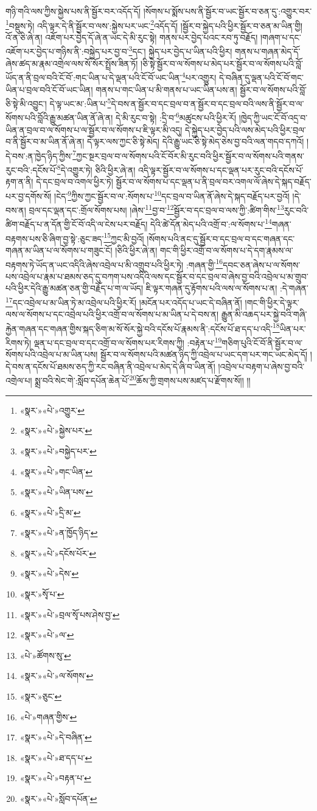 གཉི་གའི་ལས་ཀྱིས་སྐྱེས་པས་ནི་སྦྱོར་བར་འདོད་དོ། །སོགས་པ་སྨོས་པས་ནི་སྦྱོར་བ་ཡང་སྦྱོར་བ་ཅན་དུ་:འགྱུར་བར་\footnote{«སྣར་»«པེ་»འགྱུར་}བསྡུས་ཏེ། འདི་ལྟར་དེ་ནི་སྦྱོར་བ་ལས་:སྐྱེས་པར་ཡང་\footnote{«སྣར་»«པེ་»སྐྱེས་པར་}འདོད་དོ། །སྦྱོར་བ་སྐྱེད་པའི་ཕྱིར་སྦྱོར་བ་ཅན་མ་ཡིན་གྱི། འོ་ན་ཅི་ཞེ་ན། འཇོག་པར་བྱེད་དོ་ཞེ་ན་ཡང་དེ་མི་རུང་སྟེ། གནས་པར་བྱེད་པའང་རབ་ཏུ་བརྗོད། །གཞག་པ་དང་འཇོག་པར་བྱེད་པ་གཉིས་ནི་:བསྐྱེད་པར་བྱ་བ་\footnote{«སྣར་»«པེ་»བསྐྱེད་པར་}དང་། སྐྱེད་པར་བྱེད་པ་ཡིན་པའི་ཕྱིར། གནས་པ་གཞན་མེད་དོ་ཞེས་ཚད་མ་རྣམ་འགྲེལ་ལས་སོ་སོར་སྤྲོས་ཟིན་ཏོ། །ཅི་སྟེ་སྦྱོར་བ་ལ་སོགས་པ་མེད་པར་སྦྱོར་བ་ལ་སོགས་པའི་བློ་ཡོད་ན་ནི་བྲལ་བའི་ངོ་བོ་:གང་ཡིན་པ་དེ་ལྡན་པའི་ངོ་བོ་ཡང་ཡིན་\footnote{«སྣར་»«པེ་»གང་ཡིན་}པར་འགྱུར། དེ་བཞིན་དུ་ལྡན་པའི་ངོ་བོ་གང་ཡིན་པ་བྲལ་བའི་ངོ་བོ་ཡང་ཡིན། གནས་པ་གང་ཡིན་པ་མི་གནས་པ་ཡང་ཡིན་པས་ན། སྦྱོར་བ་ལ་སོགས་པའི་བློ་ཅི་སྟེ་མི་འབྱུང་། དེ་ལྟ་ཡང་མ་:ཡིན་པ་\footnote{«སྣར་»«པེ་»ཡིན་པས་}དེ་བས་ན་སྦྱོར་བ་དང་བྲལ་བ་ན་སྦྱོར་བ་དང་བྲལ་བའི་ལས་ནི་སྦྱོར་བ་ལ་སོགས་པའི་བློའི་རྒྱུ་མཚན་ཡིན་ནོ་ཞེ་ན། དེ་མི་རུང་བ་སྟེ། :དྲི་བ་\footnote{«སྣར་»«པེ་»དྲི་མ་}མཚུངས་པའི་ཕྱིར་རོ། །ཁྱེད་ཀྱི་ཡང་ངོ་བོ་འདྲ་བ་ཡིན་ན་བྲལ་བ་ལ་སོགས་པ་ལ་སྦྱོར་བ་ལ་སོགས་པ་ཇི་ལྟར་མི་འདུ། དེ་སྐྱེད་པར་བྱེད་པའི་ལས་མེད་པའི་ཕྱིར་བྲལ་བ་ནི་སྦྱོར་བ་མ་ཡིན་ནོ་ཞེ་ན། དེ་ལྟར་ལས་ཀྱང་ཅི་སྟེ་མེད། དེའི་རྒྱུ་ཡང་ཅི་སྟེ་མེད་ཅེས་བྱ་བའི་ལན་གདབ་དཀའོ། །
དེ་བས་:ན་ཁྱེད་ཉིད་ཀྱིས་\footnote{«སྣར་»«པེ་»ན་ཁྱོད་ཉིད་}ཀྱང་སྔར་བྲལ་བ་ལ་སོགས་པའི་ངོ་བོར་མི་རུང་བའི་ཕྱིར་སྦྱོར་བ་ལ་སོགས་པའི་གནས་རུང་བའི་:དངོས་པོ་\footnote{«སྣར་»«པེ་»དངོས་པོར་}དེ་འགྱུར་ཏེ། ཅིའི་ཕྱིར་ཞེ་ན། འདི་ལྟར་སྦྱོར་བ་ལ་སོགས་པ་དང་ལྡན་པར་རུང་བའི་དངོས་པོ་རྟག་ན་ནི། དེ་དང་བྲལ་བ་འགལ་ཕྱིར་ཏེ། སྦྱོར་བ་ལ་སོགས་པ་དང་ལྡན་པ་ནི་བྲལ་བར་འགལ་ལོ་ཞེས་དེ་སྐད་བརྗོད་པར་བྱ་དགོས་སོ། །ངེད་\footnote{«སྣར་»«པེ་»དེས་}ཀྱིས་ཀྱང་སྦྱོར་བ་ལ་:སོགས་པ་\footnote{«སྣར་»སྭོ་པ་}དང་བྲལ་བ་ཡིན་ནོ་ཞེས་དེ་སྐད་བརྗོད་པར་བྱའོ། །དེ་བས་ན། བྲལ་དང་ལྡན་དང་:གྲོལ་སོགས་པས། །ཞེས་\footnote{«སྣར་»«པེ་»བྲལ་སྭོ་པས་ཤེས་བྱ་}བྱ་བ་\footnote{«སྣར་»«པེ་»ལ་}སྦྱོར་བ་དང་བྲལ་བ་ལས་ཀྱི་:ཚིག་གིས་\footnote{«པེ་»ཚོགས་སུ་}རུང་བའི་ཚིག་བརྗོད་པ་ན་དོན་གྱི་ངོ་བོ་འདི་ལ་ངེས་པར་བརྗོད། དེའི་ཚེ་དོན་མེད་པའི་འགྲོ་བ་:ལ་སོགས་པ་\footnote{«སྣར་»«པེ་»ལ་སོགས་}གཞན་བརྟགས་པས་ཅི་ཞིག་བྱ་སྟེ་:ཅུང་ཟད་\footnote{«སྣར་»ཅུང་}ཀྱང་མི་བྱའོ། །སོགས་པའི་ནང་དུ་སྦྱོར་བ་དང་བྲལ་བ་དང་གཞན་དང་གཞན་མ་ཡིན་པ་ལ་སོགས་པ་གཟུང་ངོ། །ཅིའི་ཕྱིར་ཞེ་ན། གང་གི་ཕྱིར་འགྲོ་བ་ལ་སོགས་པ་དེ་དག་རྣམས་ལ་བརྟགས་ཏེ་ཡོད་ན་ཡང་འདིའི་ཞེས་འབྲེལ་པ་མི་འགྲུབ་པའི་ཕྱིར་ཏེ། :གཞན་གྱི་\footnote{«པེ་»གཞན་གྱིས་}དབང་ཅན་ཞེས་པ་ལ་སོགས་པས་འབྲེལ་པ་རྣམ་པ་ཐམས་ཅད་དུ་བཀག་པས་འདིའི་ལས་དང་སྦྱོར་བ་དང་བྲལ་བ་ཞེས་བྱ་བའི་འབྲེལ་པ་མ་གྲུབ་པའི་ཕྱིར་དེའི་རྒྱུ་མཚན་ཅན་གྱི་བརྗོད་པ་ག་ལ་ཡོད། ཇི་ལྟར་གཞན་དུ་རྟོགས་པའི་ལས་ལ་སོགས་པ་ན། :དེ་གཞན་\footnote{«སྣར་»«པེ་»དེ་བཞིན་}དང་འབྲེལ་པ་མ་ཡིན་ཏེ་མ་འབྲེལ་པའི་ཕྱིར་རོ། །མངོན་པར་འདོད་པ་ཡང་དེ་བཞིན་ནོ། །གང་གི་ཕྱིར་དེ་ལྟར་ལས་ལ་སོགས་པ་དང་འབྲེལ་པའི་ཕྱིར་འགྲོ་བ་ལ་སོགས་པ་མ་ཡིན་པ་དེ་བས་ན། རྒྱུན་མི་འཆད་པར་སྐྱེ་བའི་གཞི་རྐྱེན་གཞན་དང་གཞན་གྱིས་སྐད་ཅིག་མ་སོ་སོར་སྐྱེ་བའི་དངོས་པོ་རྣམས་ནི་:དངོས་པོ་ཐ་དད་པ་འདི་\footnote{«སྣར་»«པེ་»ཐ་དད་པ་}ཡིན་པར་རིགས་ཏེ། ལྡན་པ་དང་བྲལ་བ་དང་འགྲོ་བ་ལ་སོགས་པར་རིགས་ཀྱི། :བརྟེན་པ་\footnote{«སྣར་»«པེ་»བརྟན་པ་}གཅིག་པུའི་ངོ་བོ་ནི་སྦྱོར་བ་ལ་སོགས་པའི་འབྲེལ་པ་མ་ཡིན་པས། སྦྱོར་བ་ལ་སོགས་པའི་མཚན་ཉིད་ཀྱི་འབྲེལ་པ་ཡང་དག་པར་གང་ཡང་མེད་དོ། །དེ་བས་ན་དངོས་པོ་ཐམས་ཅད་ཀྱི་རང་བཞིན་ནི་འབྲེལ་པ་མེད་དེ་ཞི་བ་ཡིན་ནོ། །འབྲེལ་པ་བརྟག་པ་ཞེས་བྱ་བའི་འགྲེལ་པ། སྨྲ་བའི་སེང་གེ་:སློབ་དཔོན་ཆེན་པོ་\footnote{«སྣར་»«པེ་»སློབ་དཔོན་}ཆོས་ཀྱི་གྲགས་པས་མཛད་པ་རྫོགས་སོ།། །།